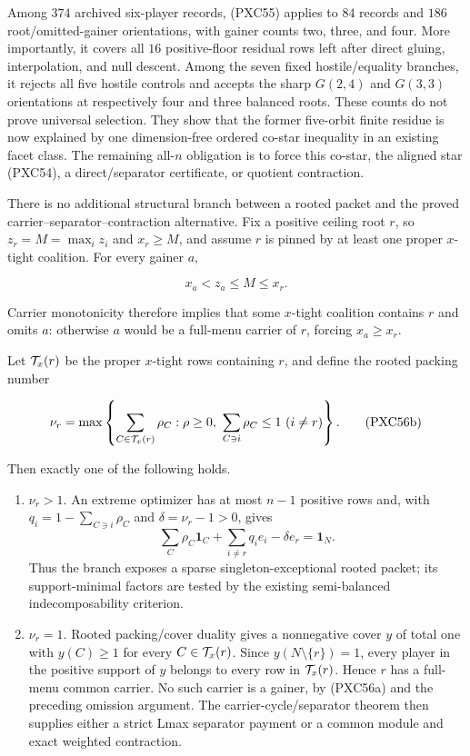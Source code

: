 \documentclass[11pt]{article}
\newcommand{\one}{\mathbf 1}
\begin{document}
Among $374$ archived six-player records, (PXC55) applies to $84$ records and
$186$ root/omitted-gainer orientations, with gainer counts two, three, and
four.  More importantly, it covers all $16$ positive-floor residual rows
left after direct gluing, interpolation, and null descent.  Among the seven
fixed hostile/equality branches, it rejects all five hostile controls and
accepts the sharp $G(2,4)$ and $G(3,3)$ orientations at respectively four
and three balanced roots.  These counts do not prove universal selection.
They show that the former five-orbit finite residue is now explained by one
dimension-free ordered co-star inequality in an existing facet class.  The
remaining all-$n$ obligation is to force this co-star, the aligned star
(PXC54), a direct/separator certificate, or quotient contraction.

There is no additional structural branch between a rooted packet and the
proved carrier--separator--contraction alternative.  Fix a positive ceiling
root $r$, so $z_r=M=\max_i z_i$ and $x_r\ge M$, and assume $r$ is pinned by
at least one proper $x$-tight coalition.  For every gainer $a$,

\[
 x_a<z_a\le M\le x_r.                                \tag{PXC56a}
\]

Carrier monotonicity therefore implies that some $x$-tight coalition
contains $r$ and omits $a$: otherwise $a$ would be a full-menu carrier of
$r$, forcing $x_a\ge x_r$.

Let ${\cal T}_x(r)$ be the proper $x$-tight rows containing $r$, and define
the rooted packing number

\[
 \nu_r=\max\left\{\sum_{C\in{\cal T}_x(r)}\rho_C:
 \rho\ge0,
 \ \sum_{C\ni i}\rho_C\le1\ (i\ne r)\right\}.       \tag{PXC56b}
\]

Then exactly one of the following holds.

\begin{enumerate}[label=(\roman*)]
\item $\nu_r>1$.  An extreme optimizer has at most $n-1$ positive rows and,
with $q_i=1-\sum_{C\ni i}\rho_C$ and $\delta=\nu_r-1>0$, gives
\[
 \sum_C\rho_C\one_C+\sum_{i\ne r}q_i e_i-\delta e_r=\one_N.      \tag{PXC56c}
\]
Thus the branch exposes a sparse singleton-exceptional rooted packet; its
support-minimal factors are tested by the existing semi-balanced
indecomposability criterion.
\item $\nu_r=1$.  Rooted packing/cover duality gives a nonnegative cover
$y$ of total one with $y(C)\ge1$ for every $C\in{\cal T}_x(r)$.  Since
$y(N\setminus\{r\})=1$, every player in the positive support of $y$ belongs
to every row in ${\cal T}_x(r)$.  Hence $r$ has a full-menu common carrier.
No such carrier is a gainer, by (PXC56a) and the preceding omission argument.
The carrier-cycle/separator theorem then supplies either a strict Lmax
separator payment or a common module and exact weighted contraction.
\end{enumerate}
\end{document}
